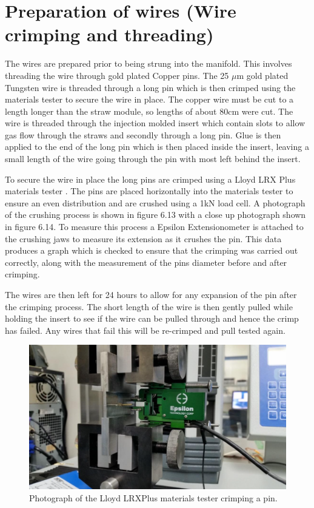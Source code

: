 \section{Preparation of wires (Wire crimping and threading)}

The wires are prepared prior to being strung into the manifold. This involves threading the wire through gold plated Copper pins. The 25 $\mu$m gold plated Tungsten wire is threaded through a long pin which is then crimped using the materials tester to secure the wire in place. The copper wire must be cut to a length longer than the straw module, so lengths of about 80cm were cut. The wire is threaded through the injection molded insert which contain slots to allow gas flow through the straws and secondly through a long pin. Glue is then applied to the end of the long pin which is then placed inside the insert, leaving a small length of the wire going through the pin with most left behind the insert. 

To secure the wire in place the long pins are crimped using a Lloyd LRX Plus materials tester \cite{LloydPlus}. The pins are placed horizontally into the materials tester to ensure an even distribution and are crushed using a 1kN load cell. A photograph of the crushing process is shown in figure 6.13 with a close up photograph shown in figure 6.14. To measure this process a Epsilon Extensionometer \cite{Extensionometer} is attached to the crushing jaws to measure its extension as it crushes the pin. This data produces a graph which is checked to ensure that the crimping was carried out correctly, along with the measurement of the pins diameter before and after crimping.

The wires are then left for 24 hours to allow for any expansion of the pin after the crimping process. The short length of the wire is then gently pulled while holding the insert to see if the wire can be pulled through and hence the crimp has failed. Any wires that fail this will be re-crimped and pull tested again. 

\begin{figure}[!h]
\centering 
\includegraphics[scale=0.75]{Figures/crimpmachine}
\decoRule
\caption{Photograph of the Lloyd LRXPlus materials tester crimping a pin.}
\label{fig:crimpmachine}
\end{figure}

